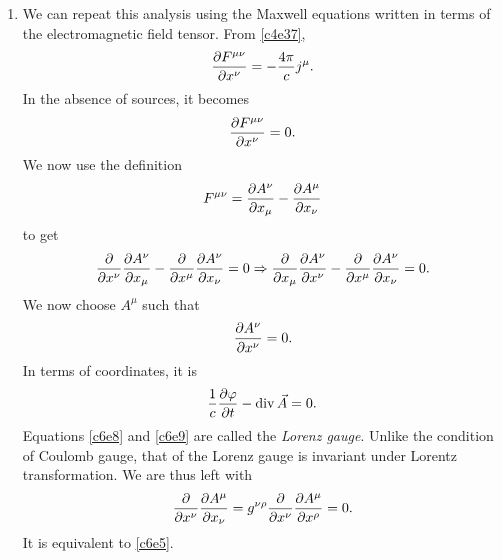 \begin{enumerate}
\item We can repeat this analysis using the Maxwell equations written in terms of
the electromagnetic field tensor. From \eqref{c4e37},
\[
\frac{\partial{F^{\mu\nu}}}{\partial{x^\nu}} = -\frac{4\pi}{c}j^\mu.
\]
In the absence of sources, it becomes
\[
\frac{\partial{F^{\mu\nu}}}{\partial{x^\nu}} = 0.
\]
We now use the definition 
\[
F^{\mu\nu} = \frac{\partial{A^\nu}}{\partial{x_\mu}} - \frac{\partial{A^\mu}}{\partial{x_\nu}}
\]
to get
\[
\frac{\partial}{\partial x^\nu}\frac{\partial{A^\nu}}{\partial{x_\mu}} - \frac{\partial}{\partial x^\mu}\frac{\partial{A^\nu}}{\partial{x_\nu}} = 0
\Rightarrow
\frac{\partial}{\partial x_\mu}\frac{\partial{A^\nu}}{\partial{x^\nu}} - \frac{\partial}{\partial x^\mu}\frac{\partial{A^\nu}}{\partial{x_\nu}} = 0.
\]
We now choose $A^\mu$ such that
\begin{equation}\label{c6e8}
\frac{\partial{A^\nu}}{\partial{x^\nu}} = 0.
\end{equation}
In terms of coordinates, it is
\begin{equation}\label{c6e9}
\frac{1}{c}\frac{\partial{\varphi}}{\partial{t}} - \operatorname{div}\vec{A} = 0.
\end{equation}
Equations \eqref{c6e8} and \eqref{c6e9} are called the \emph{Lorenz gauge}. Unlike
the condition of Coulomb gauge, that of the Lorenz gauge is invariant under Lorentz 
transformation. We are thus left with
\begin{equation}\label{c6e10}
\frac{\partial}{\partial x^\nu}\frac{\partial{A^\mu}}{\partial{x_\nu}} = 
g^{\nu\rho}\frac{\partial}{\partial x^\nu}\frac{\partial{A^\mu}}{\partial{x^\rho}} = 0.
\end{equation}
It is equivalent to \eqref{c6e5}.


\end{enumerate}
